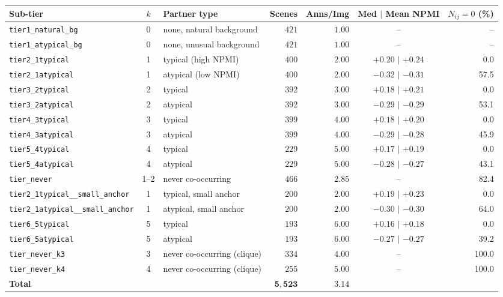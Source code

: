 \begin{tabular}{lclrrcr}
\toprule
Sub-tier & $k$ & Partner type & Scenes & Anns/Img & Med $|$ Mean NPMI & $N_{ij}{=}0$ (\%) \\
\midrule
\texttt{tier1\_natural\_bg} & 0 & none, natural background & $421$ & $1.00$ & -- & -- \\
\texttt{tier1\_atypical\_bg} & 0 & none, unusual background & $421$ & $1.00$ & -- & -- \\
\texttt{tier2\_1typical} & 1 & typical (high NPMI) & $400$ & $2.00$ & $+0.20$ $|$ $+0.24$ & 0.0 \\
\texttt{tier2\_1atypical} & 1 & atypical (low NPMI) & $400$ & $2.00$ & $-0.32$ $|$ $-0.31$ & 57.5 \\
\texttt{tier3\_2typical} & 2 & typical & $392$ & $3.00$ & $+0.18$ $|$ $+0.21$ & 0.0 \\
\texttt{tier3\_2atypical} & 2 & atypical & $392$ & $3.00$ & $-0.29$ $|$ $-0.29$ & 53.1 \\
\texttt{tier4\_3typical} & 3 & typical & $399$ & $4.00$ & $+0.18$ $|$ $+0.20$ & 0.0 \\
\texttt{tier4\_3atypical} & 3 & atypical & $399$ & $4.00$ & $-0.29$ $|$ $-0.28$ & 45.9 \\
\texttt{tier5\_4typical} & 4 & typical & $229$ & $5.00$ & $+0.17$ $|$ $+0.19$ & 0.0 \\
\texttt{tier5\_4atypical} & 4 & atypical & $229$ & $5.00$ & $-0.28$ $|$ $-0.27$ & 43.1 \\
\texttt{tier\_never} & 1--2 & never co-occurring & $466$ & $2.85$ & -- & 82.4 \\
\midrule
\texttt{tier2\_1typical\_\_small\_anchor} & 1 & typical, small anchor & $200$ & $2.00$ & $+0.19$ $|$ $+0.23$ & 0.0 \\
\texttt{tier2\_1atypical\_\_small\_anchor} & 1 & atypical, small anchor & $200$ & $2.00$ & $-0.30$ $|$ $-0.30$ & 64.0 \\
\texttt{tier6\_5typical} & 5 & typical & $193$ & $6.00$ & $+0.16$ $|$ $+0.18$ & 0.0 \\
\texttt{tier6\_5atypical} & 5 & atypical & $193$ & $6.00$ & $-0.27$ $|$ $-0.27$ & 39.2 \\
\texttt{tier\_never\_k3} & 3 & never co-occurring (clique) & $334$ & $4.00$ & -- & 100.0 \\
\texttt{tier\_never\_k4} & 4 & never co-occurring (clique) & $255$ & $5.00$ & -- & 100.0 \\
\midrule
\textbf{Total} & & & $\mathbf{5{,}523}$ & $\mathbf{3.14}$ & & \\
\bottomrule
\end{tabular}
